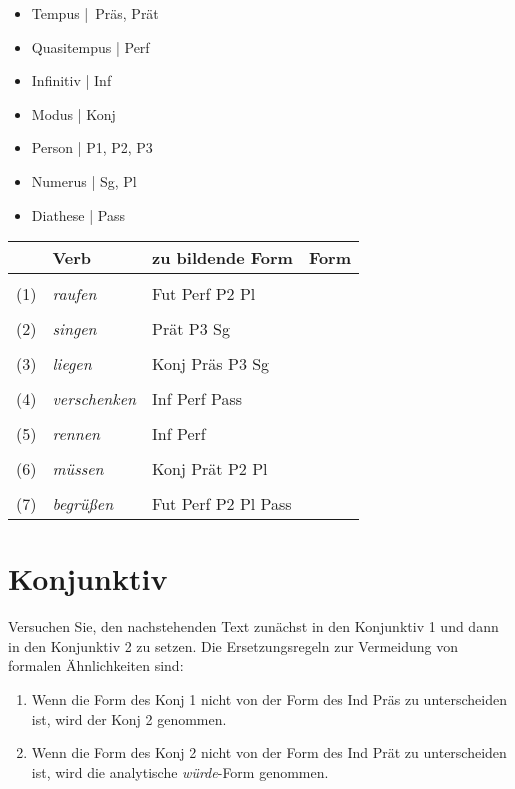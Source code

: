 \documentclass[12pt,a4paper,twoside]{article}
\newcommand{\Lf}{
  \setlength{\itemsep}{1pt}
  \setlength{\parskip}{0pt}
  \setlength{\parsep}{0pt}
}
\begin{document}
\begin{itemize}\Lf
  \item Tempus | Präs, Prät
  \item Quasitempus | Perf
  \item Infinitiv | Inf
  \item Modus | Konj
  \item Person | P1, P2, P3
  \item Numerus | Sg, Pl
  \item Diathese | Pass
\end{itemize}

\begin{center}
  \begin{tabular}[h]{cllp{}}
    \toprule
    & \textbf{Verb} & \textbf{zu bildende Form} & \textbf{Form} \\
    \midrule
    &&& \\
    (1) & \textit{raufen} & Fut Perf P2 Pl & \\\cline{4-4}
    &&& \\
    (2) & \textit{singen} & Prät P3 Sg & \\\cline{4-4}
    &&& \\
    (3) & \textit{liegen} & Konj Präs P3 Sg & \\\cline{4-4}
    &&& \\
    (4) & \textit{verschenken} & Inf Perf Pass & \\\cline{4-4}
    &&& \\
    (5) & \textit{rennen} & Inf Perf & \\\cline{4-4}
    &&& \\
    (6) & \textit{müssen} & Konj Prät P2 Pl & \\\cline{4-4}
    &&& \\
    (7) & \textit{begrüßen} & Fut Perf P2 Pl Pass & \\\cline{4-4}
  \end{tabular}
\end{center}

\newpage

\section{Konjunktiv}

Versuchen Sie, den nachstehenden Text zunächst in den Konjunktiv 1 und dann in den Konjunktiv 2 zu setzen.
Die Ersetzungsregeln zur Vermeidung von formalen Ähnlichkeiten sind:

\begin{enumerate}\Lf
  \item Wenn die Form des Konj 1 nicht von der Form des Ind Präs zu unterscheiden ist, wird der Konj 2 genommen.
  \item Wenn die Form des Konj 2 nicht von der Form des Ind Prät zu unterscheiden ist, wird die analytische \textit{würde}-Form genommen.
\end{enumerate}
\end{document}
